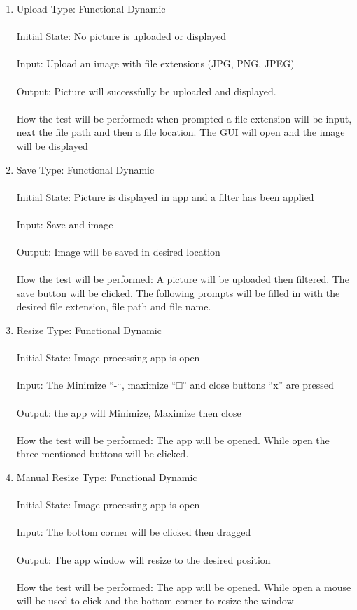 \documentclass[12pt, titlepage]{article}
\begin{document}
\begin{enumerate}
\item{Upload}
Type: Functional Dynamic \\ \\
Initial State: No picture is uploaded or displayed \\ \\
Input: Upload an image with file extensions (JPG, PNG, JPEG) \\ \\
Output: Picture will successfully be uploaded and displayed. \\ \\
How the test will be performed: when prompted a file extension will be input, next the file path and then a file location. The GUI will open and the image will be displayed
\item{Save}
Type: Functional Dynamic \\ \\
Initial State: Picture is displayed in app and a filter has been applied \\ \\
Input: Save and image \\ \\
Output: Image will be saved in desired location \\ \\
How the test will be performed: A picture will be uploaded then filtered. The save button will be clicked. The following prompts will be filled in with the desired file extension, file path and file name.

\item{Resize}
Type: Functional Dynamic \\ \\
Initial State: Image processing app is open \\ \\
Input: The Minimize “-“, maximize “□” and close buttons “x” are pressed \\ \\
Output: the app will Minimize, Maximize then close \\ \\
How the test will be performed: The app will be opened. While open the three mentioned buttons will be clicked.

\item{Manual Resize}
Type: Functional Dynamic \\ \\
Initial State: Image processing app is open \\ \\
Input: The bottom corner will be clicked then dragged \\ \\
Output: The app window will resize to the desired position \\ \\
How the test will be performed: The app will be opened. While open a mouse will be used to click and the bottom corner to resize the window
 

\end{enumerate}
\end{document}
